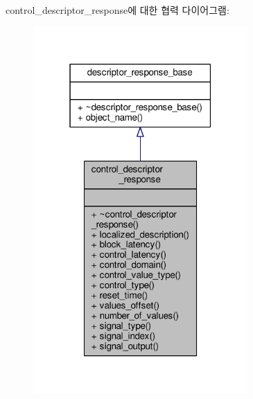 control\+\_\+descriptor\+\_\+response에 대한 협력 다이어그램\+:
\nopagebreak
\begin{figure}[H]
\begin{center}
\leavevmode
\includegraphics[width=232pt]{classavdecc__lib_1_1control__descriptor__response__coll__graph}
\end{center}
\end{figure}
